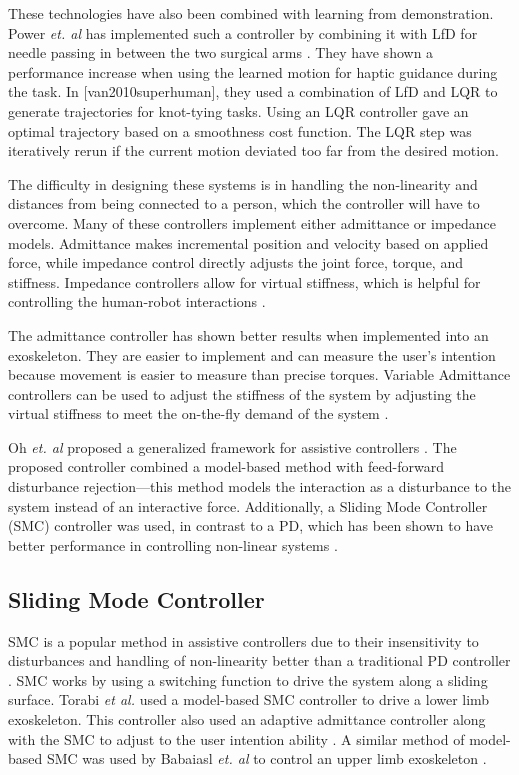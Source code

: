 These technologies have also been combined with learning from demonstration. Power \textit{et. al} has implemented such a controller by combining it with LfD for needle passing in between the two surgical arms \cite{power2015cooperative}. They have shown a performance increase when using the learned motion for haptic guidance during the task. In [van2010superhuman], they used a combination of LfD and LQR to generate trajectories for knot-tying tasks. Using an LQR controller gave an optimal trajectory based on a smoothness cost function. The LQR step was iteratively rerun if the current motion deviated too far from the desired motion. 


The difficulty in designing these systems is in handling the non-linearity and distances from being connected to a person, which the controller will have to overcome. Many of these controllers implement either admittance or impedance models. Admittance makes incremental position and velocity based on applied force, while impedance control directly adjusts the joint force, torque, and stiffness. Impedance controllers allow for virtual stiffness, which is helpful for controlling the human-robot interactions \cite{keemink2018admittance}. 

The admittance controller has shown better results when implemented into an exoskeleton. They are easier to implement and can measure the user's intention because movement is easier to measure than precise torques. Variable Admittance controllers can be used to adjust the stiffness of the system by adjusting the virtual stiffness to meet the on-the-fly demand of the system \cite{aguirre2007active,newman1994stable}.

Oh \textit{et. al} proposed a generalized framework for assistive controllers \cite{oh2015generalized}. The proposed controller combined a model-based method with feed-forward disturbance rejection—this method models the interaction as a disturbance to the system instead of an interactive force. Additionally, a Sliding Mode Controller (SMC) controller was used, in contrast to a PD, which has been shown to have better performance in controlling non-linear systems \cite{slotine1991applied}.


\subsection{Sliding Mode Controller}

SMC is a popular method in assistive controllers due to their insensitivity to disturbances and handling of non-linearity better than a traditional PD controller \cite{nasir2010performance} \cite{sanngoen2020review} \cite{fischer-SMC}. SMC works by using a switching function to drive the system along a sliding surface. Torabi \textit{et al.} used a model-based SMC controller to drive a lower limb exoskeleton. This controller also used an adaptive admittance controller along with the SMC to adjust to the user intention ability \cite{torabi2018robust}. A similar method of model-based SMC was used by Babaiasl \textit{et. al} to control an upper limb exoskeleton \cite{babaiasl2015sliding}.


